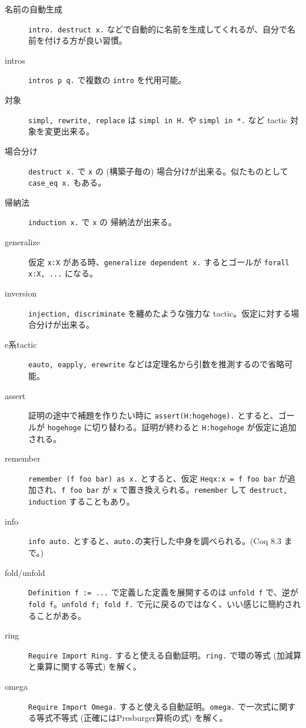 \documentclass{jarticle}
\begin{document}
\begin{description}
\item[名前の自動生成] \verb|intro. destruct x.| などで自動的に名前を生成してくれるが、自分で名前を付ける方が良い習慣。
\item[intros] \verb|intros p q.| で複数の \verb|intro| を代用可能。
\item[対象] \verb|simpl, rewrite, replace| は \verb|simpl in H.| や \verb|simpl in *.| など tactic 対象を変更出来る。
\item[場合分け] \verb|destruct x.| で \verb|x| の (構築子毎の) 場合分けが出来る。似たものとして \verb|case_eq x.| もある。
\item[帰納法] \verb|induction x.| で \verb|x| の 帰納法が出来る。
\item[generalize] 仮定 \verb|x:X| がある時、\verb|generalize dependent x.| するとゴールが \verb|forall x:X, ...| になる。
\item[inversion] \verb|injection, discriminate| を纏めたような強力な tactic。仮定に対する場合分けが出来る。
\item[e系tactic] \verb|eauto, eapply, erewrite| などは定理名から引数を推測するので省略可能。
\item[assert] 証明の途中で補題を作りたい時に \verb|assert(H:hogehoge).| とすると、ゴールが \verb|hogehoge| に切り替わる。証明が終わると \verb|H:hogehoge| が仮定に追加される。
\item[remember] \verb|remember (f foo bar) as x.| とすると、仮定 \verb|Heqx:x = f foo bar| が追加され、\verb|f foo bar| が \verb|x| で置き換えられる。\verb|remember| して \verb|destruct, induction| することもあり。 
\item[info] \verb|info auto.| とすると、\verb|auto.|の実行した中身を調べられる。(Coq $8.3$ まで。)
\item[fold/unfold] \verb|Definition f := ...| で定義した定義を展開するのは \verb|unfold f| で、逆が \verb|fold f|。\verb|unfold f; fold f.| で元に戻るのではなく、いい感じに簡約されることがある。
\item[ring] \verb|Require Import Ring.| すると使える自動証明。\verb|ring.| で環の等式 (加減算と乗算に関する等式) を解く。 
\item[omega] \verb|Require Import Omega.| すると使える自動証明。\verb|omega.| で一次式に関する等式不等式 (正確にはPresburger算術の式) を解く。 
\end{description}
\end{document}
